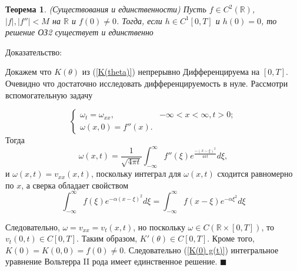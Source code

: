 \documentclass{article}
\newtheorem{theorem}{Теорема}
\begin{document}
\begin{theorem}
(Существования и единственности) Пусть $f \in C^2(\mathbb{R})$, $|f|, |f''| < M$ на $\mathbb{R}$ и $f(0) \neq 0$. Тогда, если $h \in C^1[0,T]$ и $h(0) = 0$, то решение ОЗ2 существует и единственно
\end{theorem}
Доказательство:

Докажем что $K(\theta)$ из (\ref{K(theta)}) непрерывно Дифференцируема на $[0,T]$. Очевидно что достаточно исследовать дифференцируемость в нуле. Рассмотри вспомогательную задачу

\[
\begin{cases}
\omega_t = \omega_{xx},& -\infty < x < \infty, t> 0;\\
\omega(x,0) = f''(x).
\end{cases}
\]
Тогда 
$$ 
\omega(x,t) = \dfrac{1}{\sqrt{4 \pi t}} \int_{-\infty}^{\infty} f''(\xi) e^{\frac{-(x-\xi)^2}{4 \pi t}} d\xi,
$$
и $\omega(x,t) = v_{xx} (x,t)$, поскольку интеграл для $\omega(x,t)$ сходится равномерно по $x$, а сверка обладает свойством 
\[
\int_{-\infty}^{\infty} f(\xi) e^{-\alpha(x - \xi)^2} d\xi = 
\int_{-\infty}^{\infty} f(x -\xi) e^{-\alpha \xi^2} d\xi
\]

Следовательно, $\omega = v_{xx} = v_t(x,t)$, но поскольку $\omega \in C(\mathbb{R} \times [0,T])$, то $v_t(0,t) \in C[0,T]$.
Таким образом, $K'(\theta) \in C[0,T] $. Кроме того, $K(0) = K(0,0) = f(0) \neq 0$. Следовательно (\ref{K(0) g(t)}) интегральное уравнение Вольтерра II рода имеет единственное решение. $\blacksquare$
\end{document}
